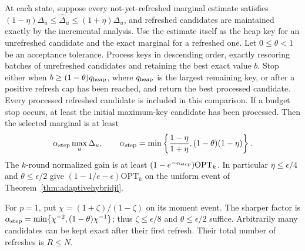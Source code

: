 \begin{theorem}
\label{thm:hybridcap}
At each state, suppose every not-yet-refreshed marginal estimate
satisfies
$(1-\eta)\Delta_u\leq\widehat\Delta_u\leq(1+\eta)\Delta_u$,
and refreshed candidates are maintained exactly by the incremental analysis.
Use the estimate itself as the heap key for an unrefreshed
candidate and the exact marginal for a refreshed one.
Let $0\leq\theta<1$ be an acceptance tolerance. Process keys
in descending order, exactly rescoring batches of unrefreshed
candidates and retaining the best exact value $b$. Stop either
when $b\geq(1-\theta)q_{\rm heap}$, where $q_{\rm heap}$ is the largest remaining
key, or after a positive refresh cap has been reached, and
return the best processed candidate. Every processed refreshed
candidate is included in this comparison. If a budget stop occurs,
at least the initial maximum-key candidate has been processed.
Then the selected marginal is at least
\[
 \alpha_{\rm step}\max_u\Delta_u,\qquad
 \alpha_{\rm step}=\min\left\{\frac{1-\eta}{1+\eta},
                           (1-\theta)(1-\eta)\right\}.
\]
The $k$-round normalized gain is at least
$(1-e^{-\alpha_{\rm step}})\mathrm{OPT}_k$.
In particular $\eta\leq\epsilon/4$ and $\theta\leq\epsilon/2$
give $(1-1/e-\epsilon)\mathrm{OPT}_k$ on the uniform event of
Theorem~\ref{thm:adaptivehybridjl}.

For $p=1$, put $\chi=(1+\zeta)/(1-\zeta)$ on its moment event.
The sharper factor is
$\alpha_{\rm step}=\min\{\chi^{-2},(1-\theta)\chi^{-1}\}$; thus
$\zeta\leq\epsilon/8$ and $\theta\leq\epsilon/2$ suffice.
Arbitrarily many candidates can be kept exact after their first
refresh. Their total number of refreshes is $R\leq N$.
\end{theorem}
